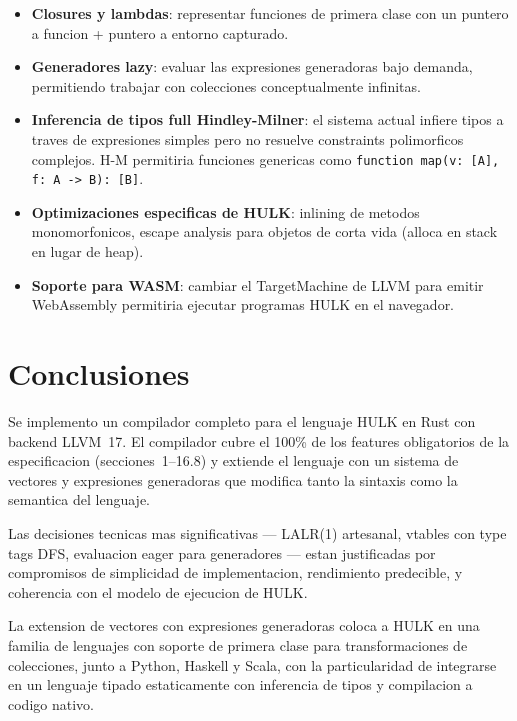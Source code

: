 \documentclass[12pt,a4paper]{article}
\begin{document}
\begin{itemize}
  \item \textbf{Closures y lambdas}: representar funciones de primera clase con
    un puntero a funcion + puntero a entorno capturado.
  \item \textbf{Generadores lazy}: evaluar las expresiones generadoras bajo demanda,
    permitiendo trabajar con colecciones conceptualmente infinitas.
  \item \textbf{Inferencia de tipos full Hindley-Milner}: el sistema actual infiere
    tipos a traves de expresiones simples pero no resuelve constraints polimorficos
    complejos. H-M permitiria funciones genericas como
    \texttt{function map(v: [A], f: A -> B): [B]}.
  \item \textbf{Optimizaciones especificas de HULK}: inlining de metodos monomorfonicos,
    escape analysis para objetos de corta vida (alloca en stack en lugar de heap).
  \item \textbf{Soporte para WASM}: cambiar el TargetMachine de LLVM para emitir
    WebAssembly permitiria ejecutar programas HULK en el navegador.
\end{itemize}

\section{Conclusiones}

Se implemento un compilador completo para el lenguaje HULK en Rust con backend LLVM~17.
El compilador cubre el 100\% de los features obligatorios de la especificacion
(secciones~1--16.8) y extiende el lenguaje con un sistema de vectores y expresiones
generadoras que modifica tanto la sintaxis como la semantica del lenguaje.

Las decisiones tecnicas mas significativas --- LALR(1) artesanal, vtables con type
tags DFS, evaluacion eager para generadores --- estan justificadas por compromisos
de simplicidad de implementacion, rendimiento predecible, y coherencia con el modelo
de ejecucion de HULK.

La extension de vectores con expresiones generadoras coloca a HULK en una familia de
lenguajes con soporte de primera clase para transformaciones de colecciones, junto a
Python, Haskell y Scala, con la particularidad de integrarse en un lenguaje tipado
estaticamente con inferencia de tipos y compilacion a codigo nativo.
\end{document}
